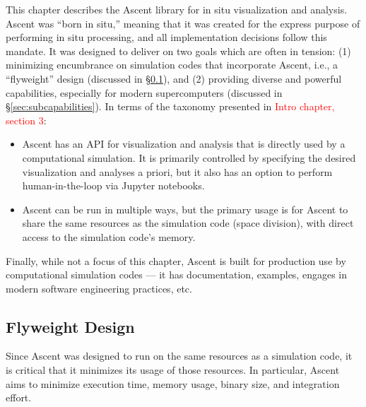 \documentclass[graybox]{svmult}
\newenvironment{tightItemize}{
        \begin{itemize}
                \setlength{\itemsep}{1pt}
                \setlength{\parskip}{0pt}
                \setlength{\parsep}{0pt}
        }{\end{itemize}
}
\newcommand{\fix}[1]{\textcolor{red}{#1}} %
\begin{document}
This chapter describes the Ascent library for in situ visualization
and analysis.
%
Ascent was ``born in situ,'' meaning that it was created for the
express purpose of performing in situ processing, and all implementation
decisions follow this mandate.
%
It was designed to deliver on two goals which are often in tension:
 (1) minimizing encumbrance on simulation codes that incorporate Ascent,
i.e., a ``flyweight'' design (discussed in \S\ref{sec:flyweight}), and
(2) providing diverse and powerful capabilities,
especially for modern supercomputers (discussed in \S\ref{sec:subcapabilities}).
%
In terms of the taxonomy presented in \fix{Intro chapter, section 3}:
\begin{tightItemize}
\item Ascent has an API for visualization and analysis that is directly
used by a computational simulation.  It is primarily controlled by
specifying the desired visualization and analyses a priori, but it
also has an option to perform human-in-the-loop via Jupyter notebooks.
\item Ascent can be run in multiple ways, but the primary usage is for
Ascent to share the same resources as the simulation code (space division),
with direct access to the simulation code's memory.
\end{tightItemize}
Finally,  while not a focus of this chapter, Ascent is built for production use by computational
simulation codes --- it has documentation,
examples, engages in modern software engineering practices, etc.

\subsection{Flyweight Design}
\label{sec:flyweight}

Since Ascent was designed to run on the same resources as a simulation code,
it is critical that it minimizes its usage of those resources.
%
In particular, Ascent aims to minimize
execution time, memory usage, binary size, and integration effort.
\end{document}
